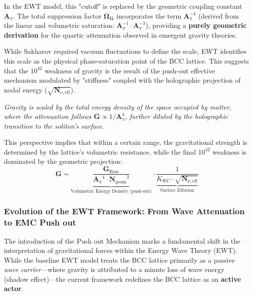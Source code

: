 \documentclass[10pt,a4paper]{article}
\begin{document}
In the EWT model, this "cutoff" is replaced by the geometric coupling constant $\mathbf{A}_{\pi}$. The total suppression factor $\mathbf{\Omega_G}$ incorporates the term $\mathbf{A}_{\pi}^{-4}$ (derived from the linear and volumetric saturation: $\mathbf{A}_{\pi}^{-1} \cdot \mathbf{A}_{\pi}^{-3}$), providing a \textbf{purely geometric derivation} for the quartic attenuation observed in emergent gravity theories. 



While Sakharov required vacuum fluctuations to define the scale, EWT identifies this scale as the physical phase-saturation point of the BCC lattice. This suggests that the $10^{42}$ weakness of gravity is the result of the push-out effective mechanism modulated by "stiffness" coupled with the holographic projection of nodal energy ($\sqrt{\mathbf{N}_{\nu, \text{eff}}}$).

\begin{center}
	\textit{Gravity is scaled by the total energy density of the space occupied by matter, where the attenuation follows $\mathbf{G} \propto 1/\mathbf{A}_{\pi}^{4}$, further diluted by the holographic transition to the soliton's surface.}
\end{center}



This perspective implies that within a certain range, the gravitational strength is determined by the lattice's volumetric resistance, while the final $10^{42}$ weakness is dominated by the geometric projection:
\begin{equation}
	\mathbf{G} = \underbrace{\frac{\mathbf{G}_{\text{Base}}}{{\mathbf{A}_{\pi}}^{4} \cdot {\mathbf{N}_{\text{geom}}}^{3}}}_{\text{Volumetric Energy Density  (push-out)}} \cdot \underbrace{\frac{1}{K_{WC} \cdot \sqrt{\mathbf{N}_{\nu, \text{eff}}}}}_{\text{Surface Dilution}}
	\label{eq:G_final_quartic}
\end{equation}

\subsubsection{Evolution of the EWT Framework: From Wave Attenuation to EMC Push out}The introduction of the Push out Mechanism marks a fundamental shift in the interpretation of gravitational forces within the Energy Wave Theory (EWT). While the baseline EWT model \cite{yee2019spacetime} treats the BCC lattice primarily as a passive \textit{wave carrier}—where gravity is attributed to a minute loss of wave energy (shadow effect)—the current framework redefines the BCC lattice as an \textbf{active actor}.
\end{document}
